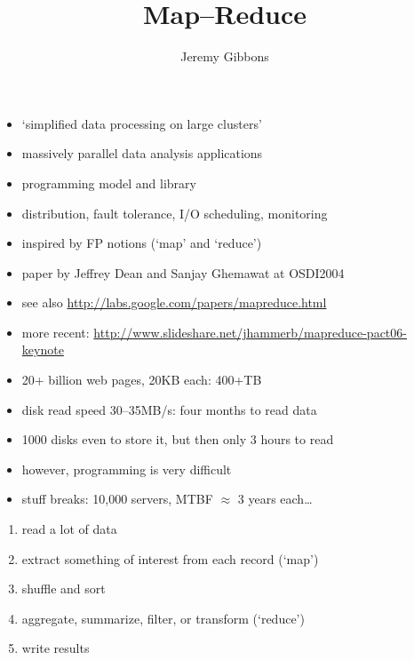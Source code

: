 \documentclass{sepslide-soa}
\title{Map--Reduce}
\author{Jeremy Gibbons}
\begin{document}

\begin{slide}
  \Title
\end{slide}

\begin{slide}
\begin{itemize}
\item `simplified data processing on large clusters'
\item massively parallel data analysis applications
\item programming model and library
\item distribution, fault tolerance, I/O scheduling, monitoring
\item inspired by FP notions (`map' and `reduce')
\item paper by Jeffrey Dean and Sanjay Ghemawat at OSDI2004
\item see also \url{http://labs.google.com/papers/mapreduce.html}
\item more recent: \url{http://www.slideshare.net/jhammerb/mapreduce-pact06-keynote}
\end{itemize}
\end{slide}

\begin{slide}
\begin{itemize}
\item 20+ billion web pages, 20KB each: 400+TB
\item disk read speed 30--35MB/s: four months to read data
\item 1000 disks even to store it, but then only 3 hours to read
\item however, programming is very difficult
\item stuff breaks: 10,000 servers, MTBF $\approx$ 3 years each\ldots
\end{itemize}
\end{slide}

\begin{slide}
\begin{enumerate}
\item read a lot of data
\item extract something of interest from each record (`map')
\item shuffle and sort
\item aggregate, summarize, filter, or transform (`reduce')
\item write results
\end{enumerate}
\end{slide}
\end{document}
